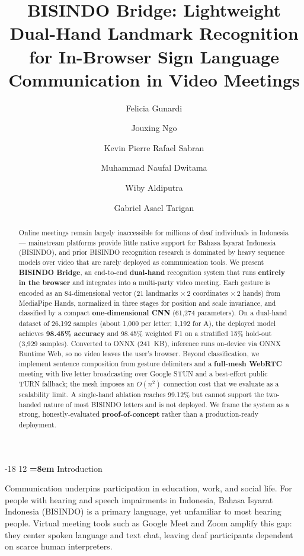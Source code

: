 \documentclass{llncs}
\title{BISINDO Bridge: Lightweight Dual-Hand Landmark Recognition for
In-Browser Sign Language Communication in Video Meetings}
\author{Felicia Gunardi\inst{1}
\and Jouxing Ngo\inst{1}
\and Kevin Pierre Rafael Sabran\inst{1}
\and Muhammad Naufal Dwitama\inst{1}
\and Wiby Aldiputra\inst{1}
\and Gabriel Asael Tarigan\inst{1}}
\institute{Computer Science Department, BINUS University, Jakarta, Indonesia}
\makeatletter
\renewcommand\section{\@startsection{section}{1}{\z@}%
                      {-18\p@ \@plus -4\p@ \@minus -4\p@}%
                      {12\p@ \@plus 4\p@ \@minus 4\p@}%
                      {\normalfont\Large\bfseries\boldmath
                       \rightskip=\z@ \@plus 8em\pretolerance=10000 }}
\newcommand{\kw}[1]{\textbf{#1}}
\makeatother
\begin{document}
\maketitle

\begin{abstract}
Online meetings remain largely inaccessible for millions of
deaf individuals in Indonesia --- mainstream platforms provide little
native support for Bahasa Isyarat Indonesia (BISINDO), and prior BISINDO
recognition research is dominated by heavy sequence models over video that
are rarely deployed as communication tools. We present \kw{BISINDO Bridge},
an end-to-end \kw{dual-hand} recognition system that runs \kw{entirely in
the browser} and integrates into a multi-party video meeting. Each gesture
is encoded as an 84-dimensional vector
($21$ landmarks $\times\,2$ coordinates $\times\,2$ hands) from MediaPipe
Hands, normalized in three stages for position and scale invariance, and
classified by a compact \kw{one-dimensional CNN} (61{,}274 parameters).
On a dual-hand
dataset of 26{,}192 samples (about 1{,}000 per letter; 1{,}192 for
A), the deployed model achieves \kw{98.45\% accuracy} and 98.45\%
weighted F1 on a stratified 15\% hold-out (3{,}929 samples). Converted to
ONNX (241~KB), inference runs on-device via ONNX Runtime Web, so no video
leaves the user's browser. Beyond classification, we implement sentence
composition from gesture delimiters and a \kw{full-mesh WebRTC} meeting
with live letter broadcasting over Google STUN and a best-effort public
TURN fallback; the mesh imposes an $O(n^2)$ connection cost that we
evaluate as a scalability limit. A single-hand ablation reaches 99.12\%
but cannot support the two-handed nature of most BISINDO letters and is
not deployed. We frame the system as a strong, honestly-evaluated
\kw{proof-of-concept} rather than a production-ready deployment.
\end{abstract}



\section{Introduction}

Communication underpins participation in education, work, and social
life. For people with hearing and speech impairments in Indonesia, Bahasa
Isyarat Indonesia (BISINDO) is a primary language, yet unfamiliar to most
hearing people. Virtual meeting tools such as Google Meet and Zoom
amplify this gap: they center spoken language and text chat, leaving deaf
participants dependent on scarce human interpreters.
\end{document}
